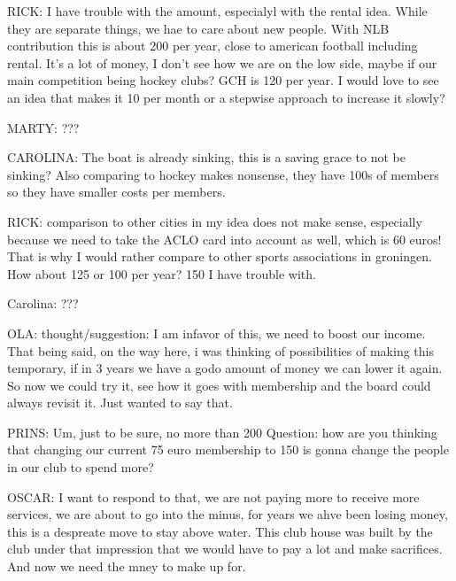 \documentclass[12pt, a4paper]{article}
\begin{document}
RICK: I have trouble with the amount, especialyl with the rental idea. While they are separate things, we hae to care about new people. With NLB contribution this is about 200 per year, close to american football including rental. It’s a lot of money, I don’t see how we are on the low side, maybe if our main competition being hockey clubs? GCH is 120 per year. I would love to see an idea that makes it 10 per month or a stepwise approach to increase it slowly? 

MARTY: ???

CAROLINA: The boat is already sinking, this is a saving grace to not be sinking? Also comparing to hockey makes nonsense, they have 100s of members so they have smaller costs per members. 

RICK: comparison to other cities in my idea does not make sense, especially because we need to take the ACLO card into account as well, which is 60 euros! That is why I would rather compare to other sports associations in groningen. How about 125 or 100 per year? 150 I have trouble with.

Carolina: ??? 

OLA: thought/suggestion: I am infavor of this, we need to boost our income. That being said, on the way here, i was thinking of possibilities of making this temporary, if in 3 years we have a godo amount of money we can lower it again. So now we could try it, see how it goes with membership and the board could always revisit it. Just wanted to say that. 

PRINS: Um, just to be sure, no more than 200%
Question: how are you thinking that changing our current 75 euro membership to 150 is gonna change the people in our club to spend more?

OSCAR: I want to respond to that, we are not paying more to receive more services, we are about to go into the minus, for years we ahve been losing money, this is  a despreate move to stay above water. This club house was built by the club under that impression that we would have to pay a lot and make sacrifices. And now we need the mney to make up for. 
\end{document}
